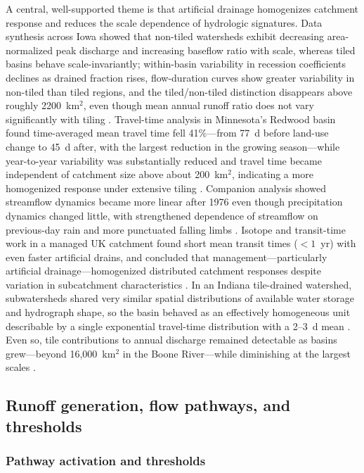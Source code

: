 A central, well-supported theme is that artificial drainage homogenizes catchment response and reduces the scale dependence of hydrologic signatures. Data synthesis across Iowa showed that non-tiled watersheds exhibit decreasing area-normalized peak discharge and increasing baseflow ratio with scale, whereas tiled basins behave scale-invariantly; within-basin variability in recession coefficients declines as drained fraction rises, flow-duration curves show greater variability in non-tiled than tiled regions, and the tiled/non-tiled distinction disappears above roughly 2200~km$^2$, even though mean annual runoff ratio does not vary significantly with tiling \parencite{BolandBrien2014}. Travel-time analysis in Minnesota's Redwood basin found time-averaged mean travel time fell 41\%---from 77~d before land-use change to 45~d after, with the largest reduction in the growing season---while year-to-year variability was substantially reduced and travel time became independent of catchment size above about 200~km$^2$, indicating a more homogenized response under extensive tiling \parencite{DaneshYazdi2016}. Companion analysis showed streamflow dynamics became more linear after 1976 even though precipitation dynamics changed little, with strengthened dependence of streamflow on previous-day rain and more punctuated falling limbs \parencite{FoufoulaGeorgiou2015}. Isotope and transit-time work in a managed UK catchment found short mean transit times ($<1$~yr) with even faster artificial drains, and concluded that management---particularly artificial drainage---homogenized distributed catchment responses despite variation in subcatchment characteristics \parencite{DimitrovaPetrova2020}. In an Indiana tile-drained watershed, subwatersheds shared very similar spatial distributions of available water storage and hydrograph shape, so the basin behaved as an effectively homogeneous unit describable by a single exponential travel-time distribution with a 2--3~d mean \parencite{Basu2010}. Even so, tile contributions to annual discharge remained detectable as basins grew---beyond 16{,}000~km$^2$ in the Boone River---while diminishing at the largest scales \parencite{Schilling2019}.

\subsection{Runoff generation, flow pathways, and thresholds}

\subsubsection{Pathway activation and thresholds}

